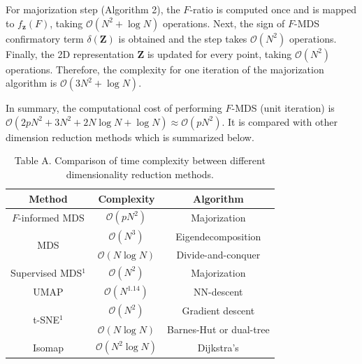 \documentclass[11pt]{article}
\newcommand{\1}{{\rm 1}\kern-0.24em{\rm I}}
\newcommand{\cO}{\mathcal{O}}
\begin{document}
For majorization step (Algorithm 2), the $F$-ratio is computed once and is mapped to $f_\mathbf{z}(F)$, taking $\cO(N^2 + \log N)$ operations.
Next, the sign of $F$-MDS confirmatory term $\delta(\mathbf{Z})$ is obtained and the step takes $\cO(N^2)$ operations.
Finally, the 2D representation $\mathbf{Z}$ is updated for every point, taking $\cO(N^2)$ operations.
Therefore, the complexity for one iteration of the majorization algorithm is $\cO(3N^2 + \log N)$.

In summary, the computational cost of performing $F$-MDS (unit iteration) is $\cO(2pN^2 + 3N^2 + 2N\log N + \log N) \approx \cO(pN^2)$. 
It is compared with other dimension reduction methods which is summarized below.

\begin{table}[h]
    \caption*{Table A. Comparison of time complexity between different dimensionality reduction methods.}
    \centering
    \begin{tabular}{c c c}
    \hline
       Method & Complexity & Algorithm \\
    \hline
        $F$-informed MDS\footnotemark & $\cO(pN^2)$ & Majorization \cite{borg97a} \\
        \multirow[c]{2}{*}{MDS} & $\cO(N^3)$ & Eigendecomposition \cite{Torgerson52} \\
         & $\cO(N\log N)$ & Divide-and-conquer \cite{Yang06} \\
        Supervised MDS$^1$ & $\cO(N^2)$ & Majorization \cite{witten11} \\
        UMAP & $\cO(N^{1.14})$ & NN-descent \cite{mcInnes18, Dong11} \\
        \multirow{2}{*}{t-SNE$^1$} & $\cO(N^2)$ & Gradient descent \cite{maaten08} \\
         & $\cO(N\log N)$ & Barnes-Hut or dual-tree \cite{Maaten14} \\
        Isomap & $\cO(N^2\log N)$ & Dijkstra’s \cite{tenenbaum00, Pedregosa11} \\
    \hline
    \end{tabular}
    \label{tab:complexity}
\end{table}


\clearpage
\end{document}
